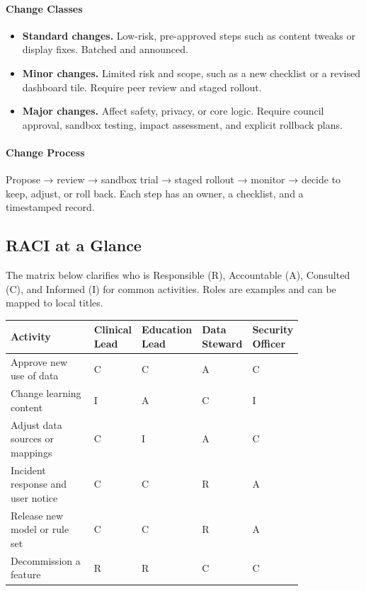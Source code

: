 \documentclass[12pt]{article}
\begin{document}
\paragraph{Change Classes}
\begin{itemize}[leftmargin=*]
  \item \textbf{Standard changes.} Low-risk, pre-approved steps such as content tweaks or display fixes. Batched and announced.
  \item \textbf{Minor changes.} Limited risk and scope, such as a new checklist or a revised dashboard tile. Require peer review and staged rollout.
  \item \textbf{Major changes.} Affect safety, privacy, or core logic. Require council approval, sandbox testing, impact assessment, and explicit rollback plans.
\end{itemize}

\paragraph{Change Process}
Propose → review → sandbox trial → staged rollout → monitor → decide to keep, adjust, or roll back. Each step has an owner, a checklist, and a timestamped record.

\subsection*{RACI at a Glance}
The matrix below clarifies who is Responsible (R), Accountable (A), Consulted (C), and Informed (I) for common activities. Roles are examples and can be mapped to local titles.

\begin{longtable}{@{}p{0.34\linewidth}p{0.12\linewidth}p{0.12\linewidth}p{0.12\linewidth}p{0.12\linewidth}@{}}
\toprule
\textbf{Activity} & \textbf{Clinical Lead} & \textbf{Education Lead} & \textbf{Data Steward} & \textbf{Security Officer} \\
\midrule
\endhead
Approve new use of data & C & C & A & C \\
Change learning content & I & A & C & I \\
Adjust data sources or mappings & C & I & A & C \\
Incident response and user notice & C & C & R & A \\
Release new model or rule set & C & C & R & A \\
Decommission a feature & R & R & C & C \\
\bottomrule
\end{longtable}
\end{document}
